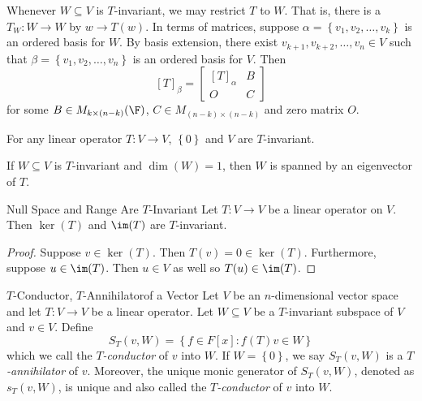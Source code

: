 \documentclass[linearalgebraII]{subfiles}
\begin{document}
    \begin{remark}
        Whenever $W\subseteq V$ is $T$-invariant, we may restrict $T$ to $W$. That is, there is a $T_W:W\to W$ by $w\to T(w)$. In terms of matrices, suppose $\alpha = \left\lbrace v_1, v_2, \ldots, v_k \right\rbrace$ is an ordered basis for $W$. By basis extension, there exist $v_{k+1}, v_{k+2}, \ldots, v_n\in V$ such that $\beta = \left\lbrace v_1, v_2, \ldots, v_n \right\rbrace$ is an ordered basis for $V$. Then
        \begin{equation*}
            \left[ T \right]_\beta = \begin{bmatrix} [T]_\alpha & B \\ O & C \end{bmatrix}
        \end{equation*}
        for some $B\in M_{k\times (n-k)}(\F)$, $C\in M_{(n-k)\times (n-k)}$ and zero matrix $O$.
    \end{remark}

    \begin{remark}
        For any linear operator $T:V\to V$, $\left\lbrace 0 \right\rbrace$ and $V$ are $T$-invariant.
    \end{remark}

    \begin{remark}
        If $W\subseteq V$ is $T$-invariant and $\dim(W) = 1$, then $W$ is spanned by an eigenvector of $T$.
    \end{remark}

    \begin{prop}{Null Space and Range Are $T$-Invariant}
        Let $T:V\to V$ be a linear operator on $V$. Then $\ker(T)$ and $\im(T)$ are $T$-invariant.
    \end{prop}

    \begin{proof}
        Suppose $v\in \ker(T)$. Then $T(v) = 0 \in \ker(T)$. Furthermore, suppose $u\in \im(T)$. Then $u\in V$ as well so $T(u)\in \im(T)$.
    \end{proof}

    \begin{definition}{$T$-Conductor, $T$-Annihilator}{of a Vector}
        Let $V$ be an $n$-dimensional vector space and let $T:V\to V$ be a linear operator. Let $W\subseteq V$ be a $T$-invariant subspace of $V$ and $v\in V$. Define
        \begin{equation*}
            S_T (v, W) = \left\lbrace f\in F[x]: f(T)v \in W \right\rbrace
        \end{equation*}
        which we call the \emph{$T$-conductor} of $v$ into $W$. If $W = \left\lbrace 0 \right\rbrace$, we say $S_T(v, W)$ is a \emph{$T$-annihilator} of $v$. Moreover, the unique monic generator of $S_T(v, W)$, denoted as $s_T(v, W)$, is unique and also called the \emph{$T$-conductor} of $v$ into $W$.
    \end{definition}
\end{document}
